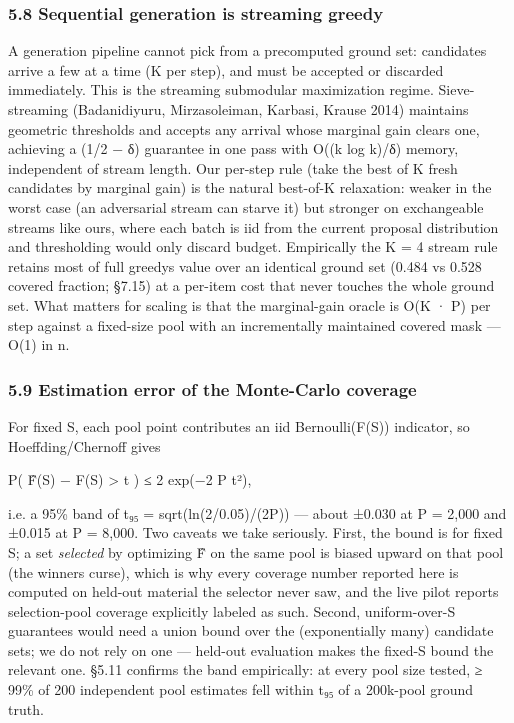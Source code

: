 \documentclass[
  10pt,
]{article}
\theoremstyle{plain}
\theoremstyle{definition}
\begin{document}
\subsubsection{5.8 Sequential generation is streaming
greedy}\label{58-sequential-generation-is-streaming-greedy}

A generation pipeline cannot pick from a precomputed ground set:
candidates arrive a few at a time (K per step), and must be accepted or
discarded immediately. This is the streaming submodular maximization
regime. Sieve-streaming (Badanidiyuru, Mirzasoleiman, Karbasi, Krause
2014) maintains geometric thresholds and accepts any arrival whose
marginal gain clears one, achieving a (1/2 − δ) guarantee in one pass
with O((k log k)/δ) memory, independent of stream length. Our per-step
rule (take the best of K fresh candidates by marginal gain) is the
natural best-of-K relaxation: weaker in the worst case (an adversarial
stream can starve it) but stronger on exchangeable streams like ours,
where each batch is iid from the current proposal distribution and
thresholding would only discard budget. Empirically the K = 4 stream
rule retains most of full greedy\textquotesingle s value over an
identical ground set (0.484 vs 0.528 covered fraction; §7.15) at a
per-item cost that never touches the whole ground set. What matters for
scaling is that the marginal-gain oracle is O(K · P) per step against a
fixed-size pool with an incrementally maintained covered mask --- O(1)
in n.

\subsubsection{5.9 Estimation error of the Monte-Carlo
coverage}\label{59-estimation-error-of-the-monte-carlo-coverage}

For fixed S, each pool point contributes an iid Bernoulli(F(S))
indicator, so Hoeffding/Chernoff gives

P( \textbar F̂(S) − F(S)\textbar{} \textgreater{} t ) ≤ 2 exp(−2 P t²),

i.e. a 95\% band of t₉₅ = sqrt(ln(2/0.05)/(2P)) --- about ±0.030 at P =
2,000 and ±0.015 at P = 8,000. Two caveats we take seriously. First, the
bound is for fixed S; a set \emph{selected} by optimizing F̂ on the same
pool is biased upward on that pool (the winner\textquotesingle s curse),
which is why every coverage number reported here is computed on held-out
material the selector never saw, and the live pilot reports
selection-pool coverage explicitly labeled as such. Second,
uniform-over-S guarantees would need a union bound over the
(exponentially many) candidate sets; we do not rely on one --- held-out
evaluation makes the fixed-S bound the relevant one. §5.11 confirms the
band empirically: at every pool size tested, ≥ 99\% of 200 independent
pool estimates fell within t₉₅ of a 200k-pool ground truth.
\end{document}
